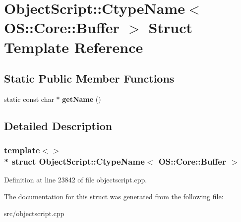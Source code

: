 \hypertarget{struct_object_script_1_1_ctype_name_3_01_o_s_1_1_core_1_1_buffer_01_4}{}\section{Object\+Script\+:\+:Ctype\+Name$<$ OS\+:\+:Core\+:\+:Buffer $>$ Struct Template Reference}
\label{struct_object_script_1_1_ctype_name_3_01_o_s_1_1_core_1_1_buffer_01_4}
\subsection*{Static Public Member Functions}
\begin{DoxyCompactItemize}
\item 
static const char $\ast$ {\bfseries get\+Name} ()\hypertarget{struct_object_script_1_1_ctype_name_3_01_o_s_1_1_core_1_1_buffer_01_4_af1f2b9675fe6b95f0836cbb771ff17a2}{}\label{struct_object_script_1_1_ctype_name_3_01_o_s_1_1_core_1_1_buffer_01_4_af1f2b9675fe6b95f0836cbb771ff17a2}

\end{DoxyCompactItemize}


\subsection{Detailed Description}
\subsubsection*{template$<$$>$\\*
struct Object\+Script\+::\+Ctype\+Name$<$ O\+S\+::\+Core\+::\+Buffer $>$}



Definition at line 23842 of file objectscript.\+cpp.



The documentation for this struct was generated from the following file\+:\begin{DoxyCompactItemize}
\item 
src/objectscript.\+cpp\end{DoxyCompactItemize}
